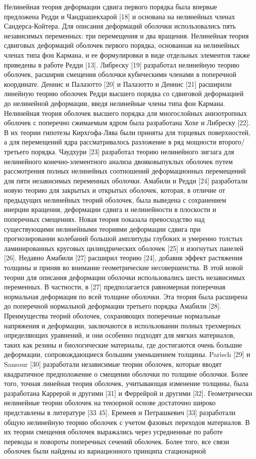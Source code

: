 Нелинейная теория деформации сдвига первого порядка была впервые предложена Редди и Чандрашекхарой [18] и основана на нелинейных членах Сандерса-Койтера. Для описания деформаций оболочки использовались пять независимых переменных: три перемещения и два вращения. Нелинейная теория сдвиговых деформаций оболочек первого порядка, основанная на нелинейных членах типа фон Кармана, и ее формулировки в виде отдельных элементов также приведены в работе Редди [13]. Либреску [19] разработал нелинейную теорию оболочек, расширив смещения оболочки кубическими членами в поперечной координате. Деннис и Палазотто [20] и Палазотто и Деннис [21] расширили линейную теорию оболочек Редди высшего порядка со сдвиговой деформацией до нелинейной деформации, введя нелинейные члены типа фон Кармана. Нелинейная теория оболочек высшего порядка для многослойных анизотропных оболочек с поперечно сжимаемым ядром была разработана Хохе и Либреску [22]. В их теории гипотезы Кирхгофа-Лява были приняты для торцевых поверхностей, а для перемещений ядра рассматривалось разложение в ряд мощности второго/третьего порядка. Чаудхури [23] разработал теорию нелинейного зигзага для нелинейного конечно-элементного анализа двояковыпуклых оболочек путем рассмотрения полных нелинейных соотношений деформационных перемещений для пяти независимых переменных оболочки. Амабили и Редди [24] разработали новую теорию для закрытых и открытых оболочек, которая, в отличие от предыдущих нелинейных теорий оболочек, была выведена с сохранением инерции вращения, деформации сдвига и нелинейности в плоскости и поперечных смещениях. Новая теория показала превосходство над существующими нелинейными теориями деформации сдвига при прогнозировании колебаний большой амплитуды глубоких и умеренно толстых ламинированных круговых цилиндрических оболочек [25] и изогнутых панелей [26]. Недавно Амабили [27] расширил теорию [24], добавив эффект растяжения толщины и приняв во внимание геометрические несовершенства. В этой новой теории для описания деформации оболочки использовались шесть независимых переменных. В частности, в [27] предполагается равномерная поперечная нормальная деформация по всей толщине оболочки. Эта теория была расширена до поперечной нормальной деформации третьего порядка Амабили [28]. Преимущества теорий оболочек, сохраняющих поперечные нормальные напряжения и деформации, заключаются в использовании полных трехмерных определяющих уравнений, и они особенно подходят для мягких материалов, таких как резины и биологические материалы, где достигаются очень большие деформации, сопровождающиеся большим уменьшением толщины. Parisch [29] и Sansour [30] разработали независимые теории оболочек, которые вводят квадратичное предположение о смещении оболочки по толщине оболочки. Более того, точная линейная теория оболочек, учитывающая изменение толщины, была разработана Каррерой и другими [31] и Феррейрой и другими [32]. Геометрически нелинейные теории оболочек на тензорной основе достаточно широко представлены в литературе [33 45]. Еремеев и Петрашкевич [33] разработали общую нелинейную теорию оболочек с учетом фазовых переходов материалов. В их теории смещения оболочек выражались через усредненные по работе переводы и повороты поперечных сечений оболочек. Более того, все связи оболочек были найдены из вариационного принципа стационарной 